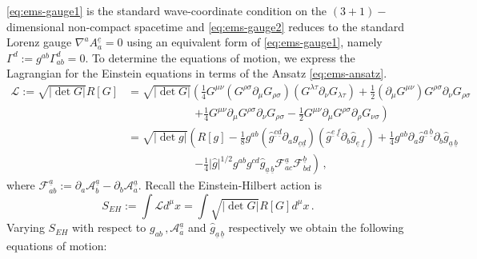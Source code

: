 \documentclass[11pt, a4paper]{amsart}
\numberwithin{equation}{section}
\numberwithin{theorem}{section}
\newcommand{\p}{\partial}
\newcommand{\A}{\mathcal{A}}
\newcommand{\mn}{{\mu \nu}}
\newcommand{\abar}{{\underline{a}}}
\newcommand{\bbar}{{\underline{b}}}
\newcommand{\cbar}{{\underline{c}}}
\newcommand{\dbar}{{\underline{d}}}
\newcommand{\abbar}{{\underline{a} \, \underline{b}}}
\begin{document}
\eqref{eq:ems-gauge1} is the standard wave-coordinate condition on the $(3+1)-$dimensional non-compact spacetime and \eqref{eq:ems-gauge2} reduces to the standard Lorenz gauge $\nabla^a A_a^\cbar = 0$ using an equivalent form of \eqref{eq:ems-gauge1}, namely $\Gamma^d := g^{ab} \Gamma^d_{ab}=0$. 
To determine the equations of motion, we express the Lagrangian for the Einstein equations in terms of the Ansatz \eqref{eq:ems-ansatz}.
\begin{align*}
\mathcal{L}:=\sqrt{\vert \det G \vert} R[G] &= \sqrt{\vert \det G \vert} \left( \frac{1}{4} G^\mn ( G^{\rho \sigma} \p_\mu G_{\rho \sigma} ) (G^{\lambda \tau} \p_\nu G_{\lambda \tau}) + \frac{1}{2} (\p_\mu G^\mn) G^{\rho \sigma} \p_\nu G_{\rho \sigma} \right. \\
& \qquad  \qquad \qquad \left. + \frac{1}{4} G^\mn \p_\mu G^{\rho \sigma} \p_\nu G_{\rho \sigma} - \frac{1}{2} G^\mn \p_\mu G^{\rho \sigma} \p_\rho G_{\nu \sigma} \right) \\
&=  \sqrt{\vert \det g \vert} \left( R[g] - \frac{1}{8} g^{ab} (\hat{g}^{\cbar \dbar} \p_a g_{\cbar \dbar} ) ( \hat{g}^{\underline{e} \, \underline{f}} \p_b \hat{g}_{\underline{e} \, \underline{f}}) + \frac{1}{4} g^{ab} \p_a \hat{g}^\abbar \p_b \hat{g}_\abbar \right. \\
& \qquad \qquad \qquad \left. - \frac{1}{4} \vert \hat{g} \vert^{1/2} g^{ab} g^{cd} \hat{g}_\abbar \mathcal{F}^\abar _{ac} \mathcal{F}^\bbar_{bd} \right) \,,
\end{align*}
where $\mathcal{F}^\abar_{ab} := \p_a \A^\abar_b - \p_b  \A^\abar_a$. 
Recall the Einstein-Hilbert action is
$$ S_{EH} := \int \mathcal{L}d^\mu x = \int \sqrt{\vert \det G \vert} R[G] d^\mu x\,.$$
Varying $S_{EH}$ with respect to $g_{ab} \,, \A^\abar_a$ and $\hat{g}_\abbar$ respectively we obtain the following equations of motion: 
\end{document}
